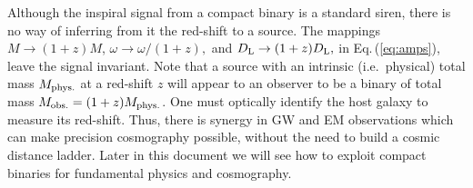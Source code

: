 Although the inspiral signal from a compact binary is a standard 
siren, there is no way of inferring from it the red-shift to a source. 
The mappings $M \rightarrow (1+z) M$, $\omega \rightarrow \omega/(1+z),$ 
and $D_{\rm L} \rightarrow (1+z) D_{\rm L},$ in Eq.\,(\ref{eq:amps}), 
leave the signal invariant.  Note that a source with an intrinsic 
(i.e.\ physical) total mass $M_{\rm phys.}$ at a red-shift $z$ will 
appear to an observer to be a binary of total mass $M_{\rm obs.}
=(1+z)M_{\rm phys.}$. One must optically identify
the host galaxy to measure its red-shift. Thus, there is
synergy in GW and EM observations which can make precision
cosmography possible, without the need to build a cosmic distance 
ladder. Later in this document we will see how to exploit
compact binaries for fundamental physics and cosmography.



%
